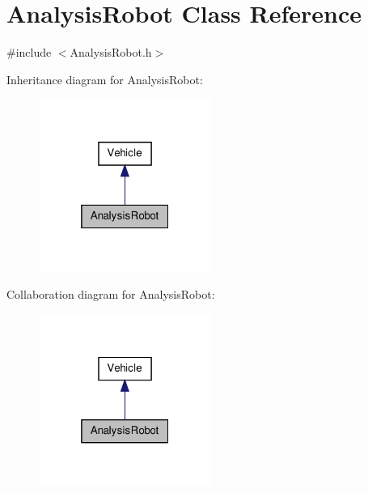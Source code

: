 \hypertarget{class_analysis_robot}{\section{Analysis\-Robot Class Reference}
\label{class_analysis_robot}
}


{\ttfamily \#include $<$Analysis\-Robot.\-h$>$}



Inheritance diagram for Analysis\-Robot\-:\nopagebreak
\begin{figure}[H]
\begin{center}
\leavevmode
\includegraphics[width=160pt]{class_analysis_robot__inherit__graph}
\end{center}
\end{figure}


Collaboration diagram for Analysis\-Robot\-:\nopagebreak
\begin{figure}[H]
\begin{center}
\leavevmode
\includegraphics[width=160pt]{class_analysis_robot__coll__graph}
\end{center}
\end{figure}

